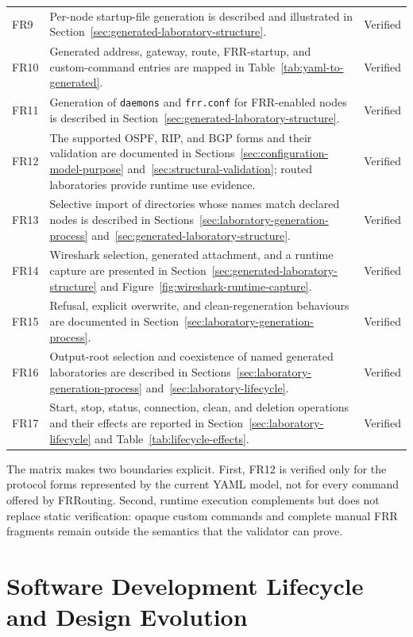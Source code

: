 \begin{longtable}{p{}p{}p{}}
FR9 & Per-node startup-file generation is described and illustrated in Section~\ref{sec:generated-laboratory-structure}. & Verified \\
FR10 & Generated address, gateway, route, FRR-startup, and custom-command entries are mapped in Table~\ref{tab:yaml-to-generated}. & Verified \\
FR11 & Generation of \texttt{daemons} and \texttt{frr.conf} for FRR-enabled nodes is described in Section~\ref{sec:generated-laboratory-structure}. & Verified \\
FR12 & The supported OSPF, RIP, and BGP forms and their validation are documented in Sections~\ref{sec:configuration-model-purpose} and~\ref{sec:structural-validation}; routed laboratories provide runtime use evidence. & Verified \\
FR13 & Selective import of directories whose names match declared nodes is described in Sections~\ref{sec:laboratory-generation-process} and~\ref{sec:generated-laboratory-structure}. & Verified \\
FR14 & Wireshark selection, generated attachment, and a runtime capture are presented in Section~\ref{sec:generated-laboratory-structure} and Figure~\ref{fig:wireshark-runtime-capture}. & Verified \\
FR15 & Refusal, explicit overwrite, and clean-regeneration behaviours are documented in Section~\ref{sec:laboratory-generation-process}. & Verified \\
FR16 & Output-root selection and coexistence of named generated laboratories are described in Sections~\ref{sec:laboratory-generation-process} and~\ref{sec:laboratory-lifecycle}. & Verified \\
FR17 & Start, stop, status, connection, clean, and deletion operations and their effects are reported in Section~\ref{sec:laboratory-lifecycle} and Table~\ref{tab:lifecycle-effects}. & Verified \\
\bottomrule
\end{longtable}

The matrix makes two boundaries explicit. First, FR12 is verified only for the
protocol forms represented by the current YAML model, not for every command
offered by FRRouting. Second, runtime execution complements but does not replace
static verification: opaque custom commands and complete manual FRR fragments
remain outside the semantics that the validator can prove.

\section{Software Development Lifecycle and Design Evolution}
\label{sec:software-development-lifecycle}

